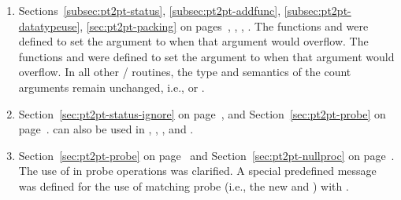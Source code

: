 \begin{enumerate}
Exceptions are , which continues to use 
(correct because of subtle rules regarding the use of 
the \code{\&} operator with ), 
and , which is changed to be 
consistent with .
 
\item 
Sections~\ref{subsec:pt2pt-status}, %
\ref{subsec:pt2pt-addfunc}, %
\ref{subsec:pt2pt-datatypeuse}, %
\ref{sec:pt2pt-packing} %
on pages~\pageref{subsec:pt2pt-status}, 
\pageref{subsec:pt2pt-addfunc},
\pageref{subsec:pt2pt-datatypeuse}, 
\pageref{sec:pt2pt-packing}.
\newline 
The functions  and  were
defined to set the  argument to  when that argument
would overflow. 
The functions  and  were 
defined to set the  argument to  when that argument 
would overflow. In all other \MPIIIDOTII/
routines, the type and semantics of the count arguments remain unchanged, i.e., 
or . 
 
\item 
Section~\ref{sec:pt2pt-status-ignore} on page~\pageref{sec:pt2pt-status-ignore}, and
Section~\ref{sec:pt2pt-probe} on page~\pageref{sec:pt2pt-probe}.
\newline 
{} can also be used in 
, ,
, and .

\item 
Section~\ref{sec:pt2pt-probe} on page~\pageref{sec:pt2pt-probe} and  
Section~\ref{sec:pt2pt-nullproc} on page~\pageref{sec:pt2pt-nullproc}. 
\newline 
The use of  in probe operations was clarified. 
A special predefined message  
was defined for the use of matching probe 
(i.e., the new  and ) 
with . 
 

\end{enumerate}
